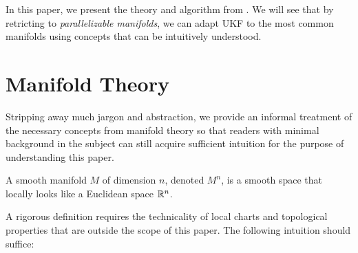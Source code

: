 \documentclass[12pt]{article}
\begin{document}
In this paper, we present the theory and algorithm from \cite{}. We will see that by retricting to \emph{parallelizable manifolds}, we can adapt UKF to the most common manifolds using concepts that can be intuitively understood.
\section{Manifold Theory}
Stripping away much jargon and abstraction, we provide an informal treatment of the necessary concepts from manifold theory so that readers with minimal background in the subject can still acquire sufficient intuition for the purpose of understanding this paper.
\begin{defn}
A smooth manifold $ M$ of dimension $ n$, denoted $ M^{n}$, is a smooth space that locally looks like a Euclidean space $ \mathbb{R}^{n}$.
\end{defn}
A rigorous definition requires the technicality of local charts and topological properties that are outside the scope of this paper. The following intuition should suffice:
\end{document}
